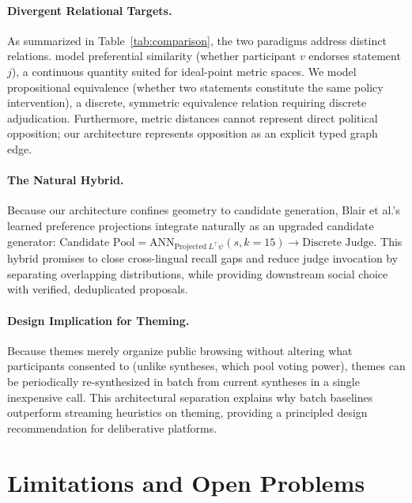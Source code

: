 \documentclass{article}
\begin{document}
\paragraph{Divergent Relational Targets.} As summarized in Table~\ref{tab:comparison}, the two paradigms address distinct relations. \citet{blair2026embeddings} model preferential similarity (whether participant $v$ endorses statement $j$), a continuous quantity suited for ideal-point metric spaces. We model propositional equivalence (whether two statements constitute the same policy intervention), a discrete, symmetric equivalence relation requiring discrete adjudication. Furthermore, metric distances cannot represent direct political opposition; our architecture represents opposition as an explicit typed graph edge.

\paragraph{The Natural Hybrid.} Because our architecture confines geometry to candidate generation, Blair et al.'s learned preference projections integrate naturally as an upgraded candidate generator: $\text{Candidate Pool} = \mathrm{ANN}_{\mathrm{Projected}\ L^\top \psi}(s, k=15) \rightarrow \text{Discrete Judge}$. This hybrid promises to close cross-lingual recall gaps and reduce judge invocation by separating overlapping distributions, while providing downstream social choice with verified, deduplicated proposals.

\paragraph{Design Implication for Theming.} Because themes merely organize public browsing without altering what participants consented to (unlike syntheses, which pool voting power), themes can be periodically re-synthesized in batch from current syntheses in a single inexpensive call. This architectural separation explains why batch baselines outperform streaming heuristics on theming, providing a principled design recommendation for deliberative platforms.

\section{Limitations and Open Problems}
\end{document}
